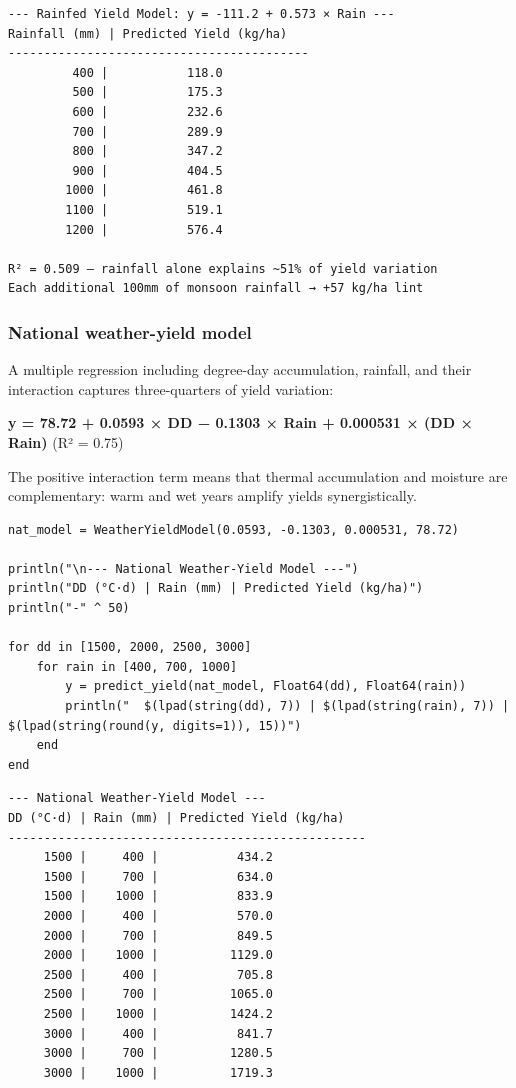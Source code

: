 \begin{verbatim}
--- Rainfed Yield Model: y = -111.2 + 0.573 × Rain ---
Rainfall (mm) | Predicted Yield (kg/ha)
------------------------------------------
         400 |           118.0
         500 |           175.3
         600 |           232.6
         700 |           289.9
         800 |           347.2
         900 |           404.5
        1000 |           461.8
        1100 |           519.1
        1200 |           576.4

R² = 0.509 — rainfall alone explains ~51% of yield variation
Each additional 100mm of monsoon rainfall → +57 kg/ha lint
\end{verbatim}



\subsubsection{National weather-yield model}



\label{6410918618957082916}{}


A multiple regression including degree-day accumulation, rainfall, and their interaction captures three-quarters of yield variation:



\textbf{y = 78.72 + 0.0593 × DD − 0.1303 × Rain + 0.000531 × (DD × Rain)} (R² = 0.75)



The positive interaction term means that thermal accumulation and moisture are complementary: warm and wet years amplify yields synergistically.




\begin{verbatim}
nat_model = WeatherYieldModel(0.0593, -0.1303, 0.000531, 78.72)

println("\n--- National Weather-Yield Model ---")
println("DD (°C·d) | Rain (mm) | Predicted Yield (kg/ha)")
println("-" ^ 50)

for dd in [1500, 2000, 2500, 3000]
    for rain in [400, 700, 1000]
        y = predict_yield(nat_model, Float64(dd), Float64(rain))
        println("  $(lpad(string(dd), 7)) | $(lpad(string(rain), 7)) | $(lpad(string(round(y, digits=1)), 15))")
    end
end
\end{verbatim}




\begin{verbatim}
--- National Weather-Yield Model ---
DD (°C·d) | Rain (mm) | Predicted Yield (kg/ha)
--------------------------------------------------
     1500 |     400 |           434.2
     1500 |     700 |           634.0
     1500 |    1000 |           833.9
     2000 |     400 |           570.0
     2000 |     700 |           849.5
     2000 |    1000 |          1129.0
     2500 |     400 |           705.8
     2500 |     700 |          1065.0
     2500 |    1000 |          1424.2
     3000 |     400 |           841.7
     3000 |     700 |          1280.5
     3000 |    1000 |          1719.3
\end{verbatim}




